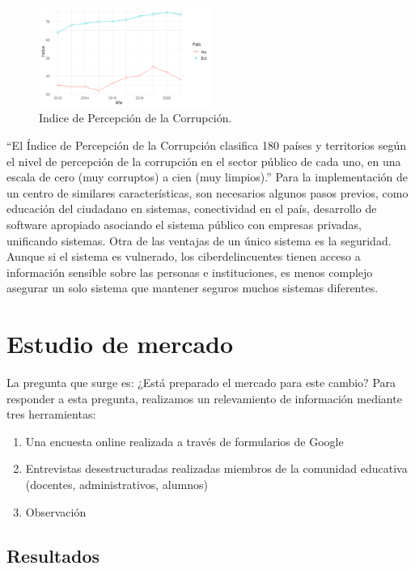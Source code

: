 \documentclass[a4paper]{article}
\begin{document}
\begin{figure}
\centering
\includegraphics[width=0.5\textwidth]{Imagen1.png}
\caption{\label{fig:Imagen1}Indice de Percepción de la Corrupción.}
\end{figure}

“El Índice de Percepción de la Corrupción clasifica 180 países y territorios según el nivel de percepción de la corrupción en el sector público de cada uno, en una escala de cero (muy corruptos) a cien (muy limpios).”
Para la implementación de un centro de similares características, son necesarios algunos pasos previos, como educación del ciudadano en sistemas, conectividad en el país, desarrollo de software apropiado asociando el sistema público con empresas privadas, unificando sistemas. Otra de las ventajas de un único sistema es la seguridad. Aunque si el sistema es vulnerado, los ciberdelincuentes tienen acceso a información sensible sobre las personas e instituciones,  es menos complejo asegurar un solo sistema que mantener seguros muchos sistemas diferentes.

\section{Estudio de mercado}

La pregunta que surge es: ¿Está preparado el mercado para este cambio? Para responder a esta pregunta, realizamos un relevamiento de información mediante tres herramientas: 

\begin{enumerate}
\item Una encuesta online realizada a través de formularios de Google
\item Entrevistas desestructuradas realizadas miembros de la comunidad educativa (docentes, administrativos, alumnos)
\item Observación
\end{enumerate}

\subsection{Resultados}
\end{document}

